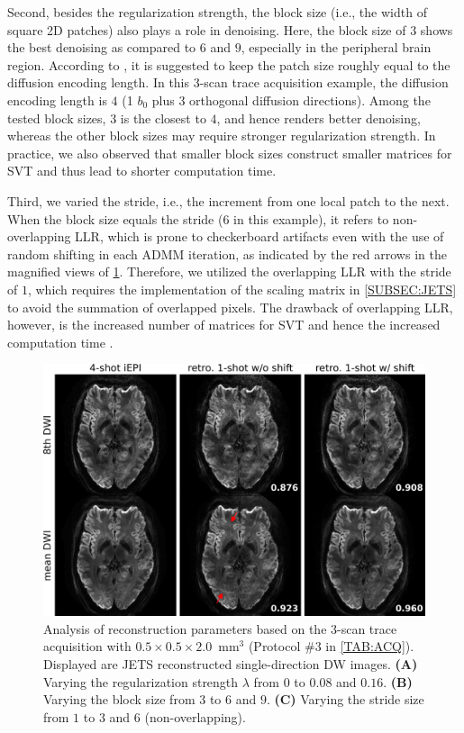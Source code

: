 \documentclass[preprint,12pt,authoryear,review]{elsarticle}
\begin{document}
    Second, besides the regularization strength,
    the block size (i.e., the width of square 2D patches) also
    plays a role in denoising.
    Here, the block size of $3$ shows the best denoising
    as compared to $6$ and $9$,
    especially in the peripheral brain region.
    According to \citep{cordero_2019_cplxdwi},
    it is suggested to keep the patch size roughly equal to
    the diffusion encoding length.
    In this 3-scan trace acquisition example,
    the diffusion encoding length is $4$
    (1 $b_0$ plus 3 orthogonal diffusion directions).
    Among the tested block sizes, $3$ is the closest to $4$,
    and hence renders better denoising,
    whereas the other block sizes may require stronger
    regularization strength.
    In practice, we also observed that smaller block sizes
    construct smaller matrices for SVT and thus
    lead to shorter computation time.

    Third, we varied the stride, i.e.,
    the increment from one local patch to the next.
    When the block size equals the stride ($6$ in this example),
    it refers to non-overlapping LLR,
    which is prone to checkerboard artifacts
    even with the use of random shifting \citep{saucedo_2017_randomshift}
    in each ADMM iteration,
    as indicated by the red arrows in the magnified views
    of \cref{FIG:ablation}.
    Therefore, we utilized the overlapping LLR with the stride of $1$,
    which requires the implementation of the scaling matrix
    in \cref{SUBSEC:JETS} to avoid the summation of overlapped pixels.
    The drawback of overlapping LLR, however, is the increased number
    of matrices for SVT and hence the increased computation time
    \citep{saucedo_2017_randomshift}.


    \begin{figure}
        \centering
        \includegraphics[width=\textwidth]{../figures/fig5.png}
        \caption{Analysis of reconstruction parameters based on
        the 3-scan trace acquisition with $0.5\times0.5\times2.0$~mm$^3$
        (Protocol \#3 in \cref{TAB:ACQ}).
        Displayed are JETS reconstructed single-direction DW images.
        \textbf{(A)} Varying the regularization strength $\lambda$
        from $0$ to $0.08$ and $0.16$.
        \textbf{(B)} Varying the block size from $3$ to $6$ and $9$.
        \textbf{(C)} Varying the stride size from $1$ to $3$ and
        $6$ (non-overlapping).}
        \label{FIG:ablation}
    \end{figure}
\end{document}
